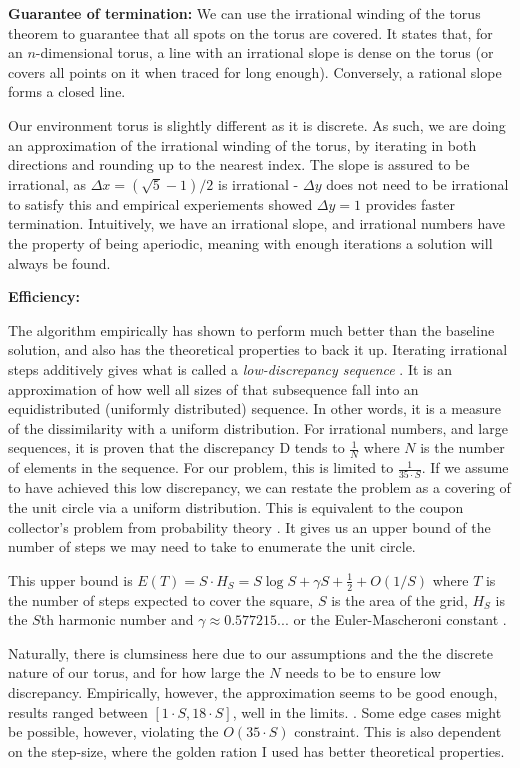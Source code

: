 \documentclass{article}
\begin{document}
\textbf{Guarantee of termination:} We can use the irrational winding of the torus theorem to guarantee that all spots on the torus are covered. It states that, for an
$n$-dimensional torus, a line with an irrational slope is dense on the torus (or covers all points on it when traced for long enough)\cite{irrational-torus}. Conversely, a rational slope forms a closed line.

Our environment torus is slightly different as it is discrete. As such, we are
doing an approximation of the irrational winding of the torus, by iterating in
both directions and rounding up to the nearest index. The slope is assured to
be irrational, as $\Delta x = (\sqrt 5 - 1)/2$ is irrational - $\Delta y$ does
not need to be irrational to satisfy this and empirical experiements showed $
    \Delta y=1$ provides faster termination. Intuitively, we have an irrational
slope, and irrational numbers have the property of being aperiodic, meaning
with enough iterations a solution will always be found.

\textbf{Efficiency:}

The algorithm empirically has shown to perform much better than the baseline
solution, and also has the theoretical properties to back it up. Iterating
irrational steps additively gives what is called a \textit{low-discrepancy
    sequence} \cite{low-discrepancy-seq}. It is an approximation of how well all
sizes of that subsequence fall into an equidistributed (uniformly distributed)
sequence. In other words, it is a measure of the dissimilarity with a uniform
distribution. For irrational numbers, and large sequences, it is proven that
the discrepancy D tends to $\frac{1}{N}$ where $N$ is the number of elements in
the sequence. For our problem, this is limited to $\frac{1}{35\cdot S}$. If we
assume to have achieved this low discrepancy, we can restate the problem as a
covering of the unit circle via a uniform distribution. This is equivalent to
the coupon collector's problem from probability theory \cite{coupon-collector}.
It gives us an upper bound of the number of steps we may need to take to
enumerate the unit circle.

This upper bound is ${E} (T)=S\cdot H_{S}=S\log S+\gamma S+{\frac {1}{2}}+O(1/S)$ where $T$ is the number of steps expected to cover the square, $S$ is the area of the grid, $H_S$ is the $S$th harmonic number and
$\gamma \approx 0.577215...$ or the Euler-Mascheroni constant \cite{coupon-collector}.

Naturally, there is clumsiness here due to our assumptions and the the discrete
nature of our torus, and for how large the $N$ needs to be to ensure low
discrepancy. Empirically, however, the approximation seems to be good enough,
results ranged between $[1 \cdot S, 18\cdot S]$, well in the limits. . Some
edge cases might be possible, however, violating the $O(35\cdot S) $ constraint.
This is also dependent on the step-size, where the golden ration I used has
better theoretical properties.
\end{document}
